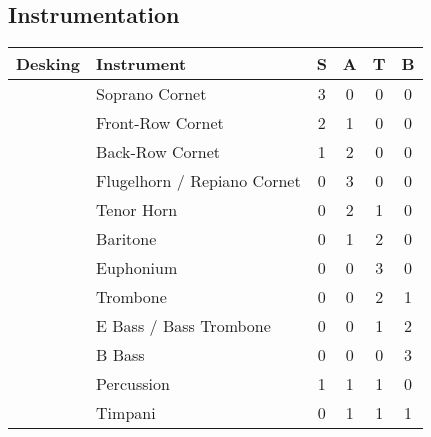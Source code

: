 \documentclass[a5paper]{article}
\newcommand{\tsqw}{%
\raisebox{-0.75ex}{\tikz{\node[draw, fill=white, inner sep=1.5ex] {};}}
}
\begin{document}
\begin{center}
\newpage
\section*{Instrumentation}
\begin{tabular}{cccc | l | cccc}\toprule
\multicolumn{4}{c|}{Desking} & Instrument & S & A & T & B \\ \midrule
&  & & \tsqw & Soprano Cornet & 3 & 0 & 0 & 0 \\[0.5ex]
\tsqw & \tsqw & \tsqw & \tsqw & Front-Row Cornet & 2 & 1 & 0 & 0 \\[0.5ex]
\tsqw & \tsqw & \tsqw & \tsqw & Back-Row Cornet & 1 & 2 & 0 & 0 \\[0.5ex]
& & \tsqw & \tsqw & Flugelhorn / Repiano Cornet & 0 & 3 & 0 & 0 \\[0.5ex]
& \tsqw & \tsqw & \tsqw & Tenor Horn & 0 & 2 & 1 & 0 \\[0.5ex]
& & \tsqw & \tsqw & Baritone & 0 & 1 & 2 & 0 \\[0.5ex]
& & \tsqw & \tsqw & Euphonium & 0 & 0 & 3 & 0 \\[0.5ex]
& & \tsqw & \tsqw & Trombone & 0 & 0 & 2 & 1 \\[0.5ex]
& \tsqw & \tsqw & \tsqw & E\myflat{} Bass / Bass Trombone & 0 & 0 & 1 & 2 \\[0.5ex]
& & \tsqw & \tsqw & B\myflat{} Bass & 0 & 0 & 0 & 3 \\[0.5ex]
& &\tsqw & \tsqw & Percussion & 1 & 1 & 1 & 0 \\[0.5ex]
& & & \tsqw & Timpani & 0 & 1 & 1 & 1 \\ \bottomrule
\end{tabular}

\vfill


\end{center}
\end{document}
